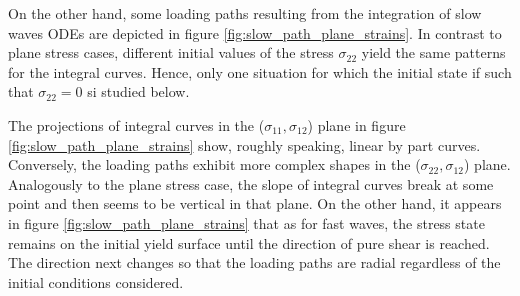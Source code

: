 On the other hand, some loading paths resulting from the integration of slow waves ODEs are depicted in figure \ref{fig:slow_path_plane_strains}.
In contrast to plane stress cases, different initial values of the stress $\sigma_{22}$ yield the same patterns for the integral curves.
Hence, only one situation for which the initial state if  such that $\sigma_{22}=0$ si studied below.

The projections of integral curves in the ($\sigma_{11},\sigma_{12}$) plane in figure \ref{fig:slow_path_plane_strains} show, roughly speaking, linear by part curves.
Conversely, the loading paths exhibit more complex shapes in the ($\sigma_{22},\sigma_{12}$) plane.
Analogously to the plane stress case, the slope of integral curves break at some point and then seems to be vertical in that plane.
On the other hand, it appears in figure \ref{fig:slow_path_plane_strains} that as for fast waves, the stress state remains on the initial yield surface until the direction of pure shear is reached.
The direction next changes so that the loading paths are radial regardless of the initial conditions considered.




